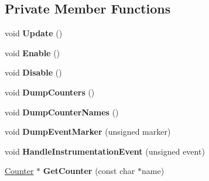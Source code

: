 \subsection*{Private Member Functions}
\begin{DoxyCompactItemize}
\item 
void {\bfseries Update} ()\hypertarget{classv8_1_1internal_1_1_instrument_a6c1533d4099de1b8d1ebea4d3805f286}{}\label{classv8_1_1internal_1_1_instrument_a6c1533d4099de1b8d1ebea4d3805f286}

\item 
void {\bfseries Enable} ()\hypertarget{classv8_1_1internal_1_1_instrument_ac97e86420bcd4d813d7c15ed6b674dc1}{}\label{classv8_1_1internal_1_1_instrument_ac97e86420bcd4d813d7c15ed6b674dc1}

\item 
void {\bfseries Disable} ()\hypertarget{classv8_1_1internal_1_1_instrument_aff6f75f519931afddb8d4c727c3bbfdb}{}\label{classv8_1_1internal_1_1_instrument_aff6f75f519931afddb8d4c727c3bbfdb}

\item 
void {\bfseries Dump\+Counters} ()\hypertarget{classv8_1_1internal_1_1_instrument_a5429e3855b88c6b68e6cb5b16863e17a}{}\label{classv8_1_1internal_1_1_instrument_a5429e3855b88c6b68e6cb5b16863e17a}

\item 
void {\bfseries Dump\+Counter\+Names} ()\hypertarget{classv8_1_1internal_1_1_instrument_a39f4b5095ca7abfa8b335df504e182b0}{}\label{classv8_1_1internal_1_1_instrument_a39f4b5095ca7abfa8b335df504e182b0}

\item 
void {\bfseries Dump\+Event\+Marker} (unsigned marker)\hypertarget{classv8_1_1internal_1_1_instrument_a158ea9a45b2e9fbe64e3814cba4acce2}{}\label{classv8_1_1internal_1_1_instrument_a158ea9a45b2e9fbe64e3814cba4acce2}

\item 
void {\bfseries Handle\+Instrumentation\+Event} (unsigned event)\hypertarget{classv8_1_1internal_1_1_instrument_a04eef1e50bf1a09e91b494b2ca6041ce}{}\label{classv8_1_1internal_1_1_instrument_a04eef1e50bf1a09e91b494b2ca6041ce}

\item 
\hyperlink{classv8_1_1internal_1_1_counter}{Counter} $\ast$ {\bfseries Get\+Counter} (const char $\ast$name)\hypertarget{classv8_1_1internal_1_1_instrument_ab8fef0365c62ba1f1f07ad46c3d97a14}{}\label{classv8_1_1internal_1_1_instrument_ab8fef0365c62ba1f1f07ad46c3d97a14}


\end{DoxyCompactItemize}
